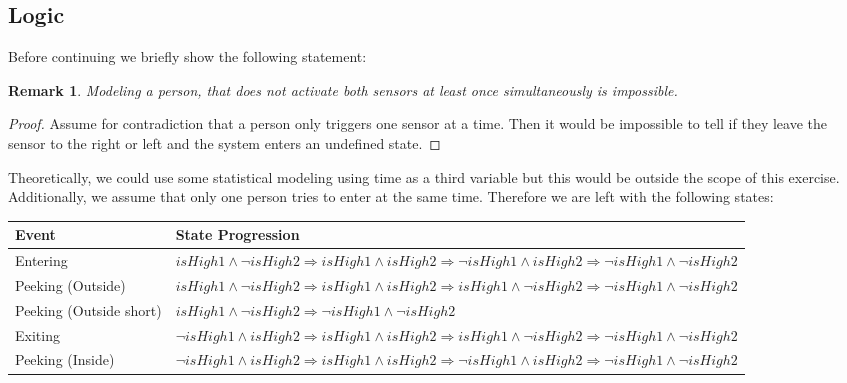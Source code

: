\documentclass[]{article}
\newtheorem*{remark}{Remark}
\begin{document}
\begin{sloppypar}
\subsection{Logic}
Before continuing we briefly show the following statement:\\
\begin{remark}
	Modeling a person, that does not activate both sensors at least once simultaneously is impossible.
\end{remark}
\begin{proof}
	Assume for contradiction that a person only triggers one sensor at a time. Then it would be impossible to tell if they leave the sensor to the right or left and the system enters an undefined state.
\end{proof}
Theoretically, we could use some statistical modeling using time as a third variable but this would be outside the scope of this exercise.\\
Additionally, we assume that only one person tries to enter at the same time.
Therefore we are left with the following states:
\begin{table}[H]
	\centering
\begin{tabularx}{.9\textwidth}{| l | X |}
			\hline
			Event & State Progression \\
			\hline
			Entering & $\mathit{isHigh1} \wedge \neg \mathit{isHigh2} \Longrightarrow \mathit{isHigh1} \wedge \mathit{isHigh2} \Longrightarrow \neg \mathit{isHigh1} \wedge \mathit{isHigh2} \Longrightarrow \neg \mathit{isHigh1} \wedge \neg \mathit{isHigh2}$\\
			\hline
			Peeking (Outside) & $\mathit{isHigh1} \wedge \neg \mathit{isHigh2} \Longrightarrow \mathit{isHigh1} \wedge \mathit{isHigh2} \Longrightarrow \mathit{isHigh1} \wedge \neg \mathit{isHigh2} \Longrightarrow \neg \mathit{isHigh1} \wedge \neg \mathit{isHigh2}$\\
			\hline
			Peeking (Outside short) & $\mathit{isHigh1} \wedge \neg \mathit{isHigh2} \Longrightarrow \neg \mathit{isHigh1} \wedge \neg \mathit{isHigh2}$\\
			\hline
			Exiting &  $\neg \mathit{isHigh1} \wedge \mathit{isHigh2} \Longrightarrow \mathit{isHigh1} \wedge \mathit{isHigh2} \Longrightarrow \mathit{isHigh1} \wedge \neg \mathit{isHigh2} \Longrightarrow \neg \mathit{isHigh1} \wedge \neg \mathit{isHigh2}$\\
			\hline
			Peeking (Inside) & $\neg \mathit{isHigh1} \wedge \mathit{isHigh2} \Longrightarrow \mathit{isHigh1} \wedge \mathit{isHigh2} \Longrightarrow \neg \mathit{isHigh1} \wedge \mathit{isHigh2} \Longrightarrow \neg \mathit{isHigh1} \wedge \neg \mathit{isHigh2}$\\

\end{tabularx}
\end{table}
\end{sloppypar}
\end{document}
